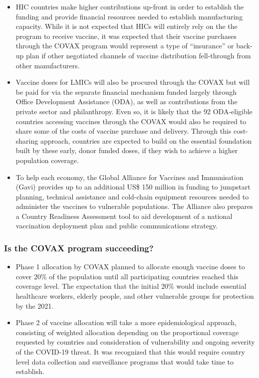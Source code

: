 \documentclass[
  11pt,
  paper=a4,
  ,captions=tableheading
]{scrartcl}
\begin{document}
\begin{itemize}
\item
  HIC countries make higher contributions up-front in order to establish
  the funding and provide financial resources needed to establish
  manufacturing capacity. While it is not expected that HICs will
  entirely rely on the the program to receive vaccine, it was expected
  that their vaccine purchases through the COVAX program would represent
  a type of ``insurance'' or back-up plan if other negotiated channels
  of vaccine distribution fell-through from other manufacturers.
\item
  Vaccine doses for LMICs will also be procured through the COVAX but
  will be paid for via the separate financial mechanism funded largely
  through Office Development Assistance (ODA), as well as contributions
  from the private sector and philanthropy. Even so, it is likely that
  the 92 ODA-eligible countries accessing vaccines through the COVAX
  would also be required to share some of the costs of vaccine purchase
  and delivery. Through this cost-sharing approach, countries are
  expected to build on the essential foundation built by these early,
  donor funded doses, if they wish to achieve a higher population
  coverage.
\item
  To help each economy, the Global Alliance for Vaccines and
  Immunisation (Gavi) provides up to an additional US\$ 150 million in
  funding to jumpstart planning, technical assistance and cold-chain
  equipment resources needed to administer the vaccines to vulnerable
  populations. The Alliance also prepares a Country Readiness Assessment
  tool to aid development of a national vaccination deployment plan and
  public communications strategy.
\end{itemize}

\hypertarget{is-the-covax-program-succeeding}{%
\subsubsection*{Is the COVAX program
succeeding?}\label{is-the-covax-program-succeeding}}

\begin{itemize}
\item
  Phase 1 allocation by COVAX planned to allocate enough vaccine doses
  to cover 20\% of the population until all participating countries
  reached this coverage level. The expectation that the initial 20\%
  would include essential healthcare workers, elderly people, and other
  vulnerable groups for protection by the 2021.
\item
  Phase 2 of vaccine allocation will take a more epidemiological
  approach, consisting of weighted allocation depending on the
  proportional coverage requested by countries and consideration of
  vulnerability and ongoing severity of the COVID-19 threat. It was
  recognized that this would require country level data collection and
  surveillance programs that would take time to establish.
\end{itemize}
\end{document}
